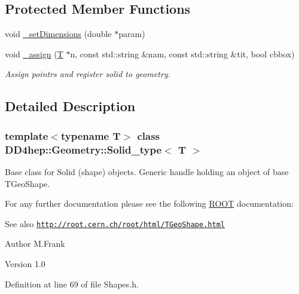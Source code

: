 \subsection*{Protected Member Functions}
\begin{DoxyCompactItemize}
\item 
void \hyperlink{class_d_d4hep_1_1_geometry_1_1_solid__type_a1a3a86774632f79e32518a7c77ad1fe8}{\_\-setDimensions} (double $\ast$param)
\item 
void \hyperlink{class_d_d4hep_1_1_geometry_1_1_solid__type_aada9040dac58ebc0dcd7562ff99ce600}{\_\-assign} (\hyperlink{class_t}{T} $\ast$n, const std::string \&nam, const std::string \&tit, bool cbbox)
\begin{DoxyCompactList}\small\item\em Assign pointrs and register solid to geometry. \item\end{DoxyCompactList}\end{DoxyCompactItemize}


\subsection{Detailed Description}
\subsubsection*{template$<$typename T$>$ class DD4hep::Geometry::Solid\_\-type$<$ T $>$}

Base class for Solid (shape) objects. Generic handle holding an object of base TGeoShape.

For any further documentation please see the following \hyperlink{namespace_r_o_o_t}{ROOT} documentation: \begin{DoxySeeAlso}{See also}
\href{http://root.cern.ch/root/html/TGeoShape.html}{\tt http://root.cern.ch/root/html/TGeoShape.html}
\end{DoxySeeAlso}
\begin{DoxyAuthor}{Author}
M.Frank 
\end{DoxyAuthor}
\begin{DoxyVersion}{Version}
1.0 
\end{DoxyVersion}


Definition at line 69 of file Shapes.h.

